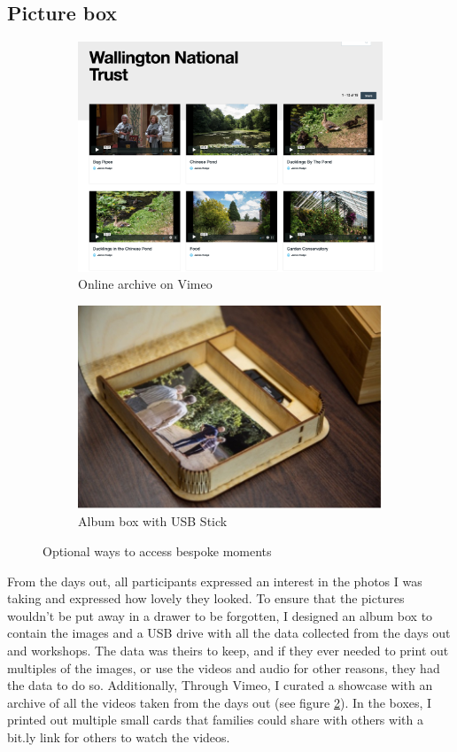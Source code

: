 \subsection{Picture box}
\label{PictureBox}

\begin{figure}[htp]
\centering
\begin{subfigure}{.5\textwidth}
  \centering
  \includegraphics[width=.8\linewidth]{Images/ChapterFour/VimeoWebsite.png}
  \caption{Online archive on Vimeo}
  \label{fig:onlineArchive}
\end{subfigure}%
\begin{subfigure}{.5\textwidth}
  \centering
  \includegraphics[width=.8\linewidth]{Images/ChapterFour/InsidePhotoAlbum.jpg}
  \caption{Album box with USB Stick}
  \label{fig:AlbumBox}
\end{subfigure}
\caption{Optional ways to access bespoke moments}
\label{fig:OptionalMoments}
\end{figure}

From the days out, all participants expressed an interest in the photos I was taking and expressed how lovely they looked. To ensure that the pictures wouldn't be put away in a drawer to be forgotten, I designed an album box to contain the images and a USB drive with all the data collected from the days out and workshops. The data was theirs to keep, and if they ever needed to print out multiples of the images, or use the videos and audio for other reasons, they had the data to do so. Additionally, Through Vimeo, I curated a showcase with an archive of all the videos taken from the days out (see figure \ref{fig:AlbumBox}). In the boxes, I printed out multiple small cards that families could share with others with a bit.ly link for others to watch the videos. 

